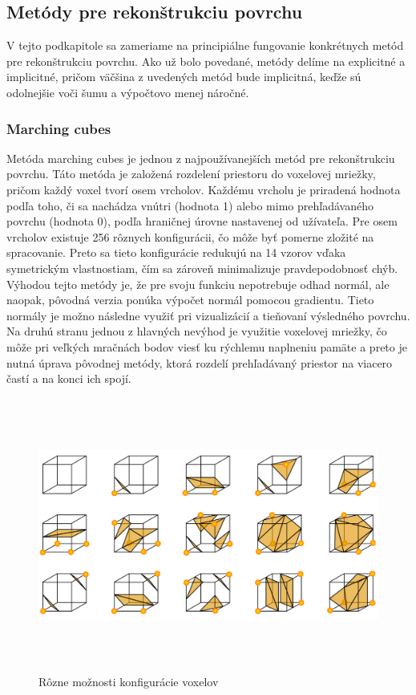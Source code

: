 \subsection{Metódy pre rekonštrukciu povrchu}
\noindent V tejto podkapitole sa zameriame na principiálne fungovanie konkrétnych metód pre rekonštrukciu povrchu. Ako už bolo povedané, metódy delíme na explicitné a implicitné, pričom väčšina z uvedených metód bude implicitná, keďže sú odolnejšie voči šumu a výpočtovo menej náročné. 
\subsubsection{Marching cubes} \label{sec:marching_cubes}
\noindent Metóda marching cubes je jednou z najpoužívanejších metód pre rekonštrukciu povrchu. Táto metóda je založená rozdelení priestoru do voxelovej mriežky, pričom každý voxel tvorí osem vrcholov. Každému vrcholu je priradená hodnota podľa toho, či sa nachádza vnútri (hodnota 1) alebo mimo prehľadávaného povrchu (hodnota 0), podľa hraničnej úrovne nastavenej od užívateľa. Pre osem vrcholov existuje 256 rôznych konfigurácii, čo môže byť pomerne zložité na spracovanie. Preto sa tieto konfigurácie redukujú na 14 vzorov vďaka symetrickým vlastnostiam, čím sa zároveň minimalizuje pravdepodobnosť chýb. \cite{MarchingCubeas_origin}
\newline\indent Výhodou tejto metódy je, že pre svoju funkciu nepotrebuje odhad normál, ale naopak, pôvodná verzia ponúka výpočet normál pomocou gradientu. Tieto normály je možno následne využiť pri vizualizácií a tieňovaní výsledného povrchu. Na druhú stranu jednou z hlavných nevýhod je využitie voxelovej mriežky, čo môže pri veľkých mračnách bodov viesť ku rýchlemu naplneniu pamäte a preto je nutná úprava pôvodnej metódy, ktorá rozdelí prehľadávaný priestor na viacero častí a na konci ich spojí.
\begin{figure}[!htbp]
  \centering
  \includegraphics[width=16cm, height=9cm]{img/marching_cubes.png}
  \caption{Rôzne možnosti konfigurácie voxelov \cite{MarchCubes_img}} 
  \label{marchingCubes}
\end{figure} 
